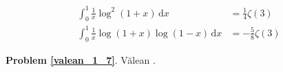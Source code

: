 %

\begin{problem_with_solution}
    \label{valean_1_7}%
    \begin{align}
        \int_0^1 \frac{1}{x} \log^2 (1+x) \,\mathrm{d}x & = \frac{1}{4} \zeta(3) \\
        \int_0^1 \frac{1}{x} \log (1+x) \log (1-x) \,\mathrm{d}x & = -\frac{5}{8} \zeta(3)
    \end{align}
\end{problem_with_solution}


\textbf{Problem \ref{valean_1_7}}.
Vălean \cite[s. 4]{nahin15}.


%